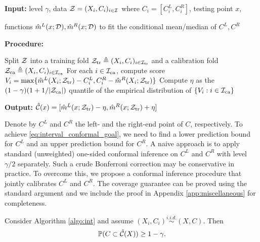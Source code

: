 \begin{algorithm}[H]
  \caption{(Unweighted) conformal inference for interval outcomes}  \label{algo:int}
  \textbf{Input: } level $\gamma$, data $\mathcal{Z} = (X_{i}, C_{i})_{i\in \mathcal{I}}$ where $C_{i} = [C_{i}^{L}, C_{i}^{R}]$, testing point $x$, 

  \hspace{1.3cm} functions $\hat{m}^{L}(x; \mathcal{D}), \hat{m}^{R}(x; \mathcal{D})$ to fit the conditional mean/median of $C^{L}, C^{R}$

  \textbf{Procedure: }
  \begin{algorithmic}[1]
    \State Split $\mathcal{Z}$ into a training fold $\mathcal{Z}_{\mathrm{tr}} \triangleq (X_{i}, C_{i})_{i\in \mathcal{I}_{\mathrm{tr}}}$ and a calibration fold $\mathcal{Z}_{\mathrm{ca}}\triangleq (X_{i}, C_{i})_{i\in \mathcal{I}_{\mathrm{ca}}}$
    \State For each $i \in \mathcal{I}_{\mathrm{ca}}$, compute score $V_{i} = \max\{\hat{m}^{L}(X_{i}; \mathcal{Z}_{\mathrm{tr}}) - C_{i}^{L}, C_{i}^{R} - \hat{m}^{R}(X_{i}; \mathcal{Z}_{\mathrm{tr}})\}$
    \State Compute $\eta$ as the $(1 - \gamma)(1 + 1 / |\mathcal{Z}_{\mathrm{ca}}|)$ quantile of the empirical distribution of $\{V_{i}: i\in \mathcal{I}_{\mathrm{ca}}\}$
  \end{algorithmic}

  \textbf{Output: $\hat{\mathcal{C}}(x) = [\hat{m}^{L}(x; \mathcal{Z}_{\mathrm{tr}}) - \eta, \hat{m}^{R}(x; \mathcal{Z}_{\mathrm{tr}}) + \eta]$}
\end{algorithm}


Denote by $C^{L}$ and $C^{R}$ the left- and the right-end point of
$C$, respectively. To achieve \eqref{eq:interval_conformal_goal}, we
need to find a lower prediction bound for $C^{L}$ and an upper
prediction bound for $C^{R}$. A naive approach is to apply standard
(unweighted) one-sided conformal inference on $C^{L}$ and $C^{R}$ with
level $\gamma / 2$ separately. Such a crude Bonferroni correction may
be conservative in practice. To overcome this, we propose a conformal
inference procedure that jointly calibrates $C^{L}$ and $C^{R}$. The
coverage guarantee can be proved using the standard argument
\citep[e.g.][]{lei2018distribution, romano2019conformalized} and we
include the proof in Appendix \ref{app:miscellaneous} for
completeness. 
\begin{theorem}\label{thm:int_conformal}
  Consider Algorithm \ref{algo:int} and assume $(X_{i}, C_{i})\stackrel{i.i.d.}{\sim} (X, C)$. Then
  \[\mathbb{P}(C\subset \hat{\mathcal{C}}(X))\ge 1 - \gamma.\]
\end{theorem}

